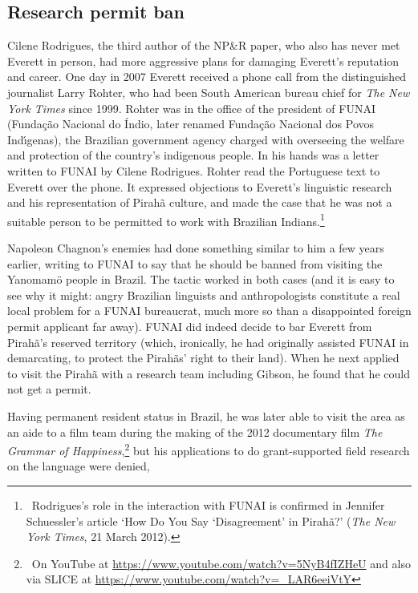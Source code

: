 \documentclass[output=paper,colorlinks,citecolor=brown
]{langscibook}
\begin{document}
\subsection{Research permit ban}

Cilene Rodrigues, the third author of the NP\&R paper, who also has never
met Everett in person, had more aggressive plans for damaging Everett's
reputation and career. One day in 2007 Everett received a phone call
from the distinguished journalist Larry Rohter, who had been South
American bureau chief for \textit{The New York Times} since 1999.
Rohter was in the office of the president of FUNAI (Funda{\c{c}}{\~a}o
Nacional do {\'I}ndio, later renamed Funda{\c{c}}{\~a}o Nacional dos
Povos Ind{\'\i}genas), the Brazilian government agency charged with
overseeing the welfare and protection of the country's indigenous
people. In his hands was a letter written to FUNAI by Cilene Rodrigues.
Rohter read the Portuguese text to Everett over the phone. It expressed
objections to Everett's linguistic research and his representation
of Pirah{\~a} culture, and made the case that he was not a suitable
person to be permitted to work with Brazilian Indians.\footnote{\,
   Rodrigues's role in the interaction with FUNAI is confirmed in
   Jennifer Schuessler's article `How Do You Say `Disagreement' in
   Pirah{\~a}?' (\textit{The New York Times}, 21 March 2012).}

Napoleon Chagnon's enemies had done something similar to him a few
years earlier, writing to FUNAI to say that he should be banned from
visiting the Yanomam{\"o} people in Brazil. The tactic worked in both
cases (and it is easy to see why it might: angry Brazilian linguists and
anthropologists constitute a real local problem for a FUNAI bureaucrat,
much more so than a disappointed foreign permit applicant far away).
FUNAI did indeed decide to bar Everett from Pirah{\~a}'s reserved
territory (which, ironically, he had originally assisted FUNAI in
demarcating, to protect the Pirah{\~a}s' right to their land). When
he next applied to visit the Pirah{\~a} with a research team including
Gibson, he found that he could not get a permit.

Having permanent resident status in Brazil, he was later able to visit the
area as an aide to a film team during the making of the 2012 documentary
film \textit{The Grammar of Happiness},\footnote{\,
   On YouTube at \url{https://www.youtube.com/watch?v=5NyB4fIZHeU} and
   also via SLICE at \url{https://www.youtube.com/watch?v=_LAR6eeiVtY}}
but his applications to do grant-supported field research on the language
were denied,
\end{document}
